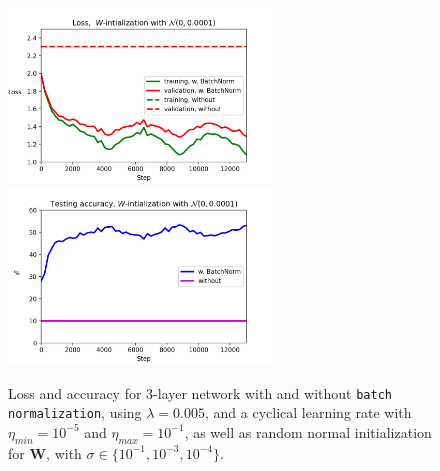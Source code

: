 \documentclass{article}
\begin{document}
\begin{figure}[h!]
		\includegraphics[width=7cm]{../plots/loss_comp_sigma3.png}
		\includegraphics[width=7cm]{../plots/acc_comp_sigma3.png}
		\caption{Loss and accuracy for $3$-layer network with and without \texttt{batch normalization}, using $\lambda=0.005$, and a cyclical learning rate with $\eta_{min} = 10^{-5}$ and $\eta_{max} = 10^{-1}$, as well as random normal initialization for $\bm{W}$, with $\sigma\in\{10^{-1}, 10^{-3}, 10^{-4}\}$.}
	\end{figure}
\end{document}
